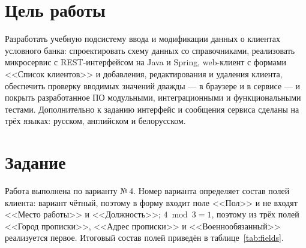 \documentclass[14pt,a4paper]{extarticle}
\begin{document}

\tableofcontents

\section{Цель работы}

Разработать учебную подсистему ввода и модификации данных о клиентах условного банка:
спроектировать схему данных со справочниками, реализовать микросервис с REST-интерфейсом
на Java и Spring, web-клиент с формами <<Список клиентов>> и добавления, редактирования и
удаления клиента, обеспечить проверку вводимых значений дважды --- в браузере и в сервисе ---
и покрыть разработанное ПО модульными, интеграционными и функциональными тестами.
Дополнительно к заданию интерфейс и сообщения сервиса сделаны на трёх языках: русском,
английском и белорусском.

\section{Задание}

Работа выполнена по варианту №\,4. Номер варианта определяет состав полей клиента: вариант
чётный, поэтому в форму
входит поле <<Пол>> и не входят <<Место работы>> и <<Должность>>; $4 \bmod 3 = 1$, поэтому
из трёх полей <<Город прописки>>, <<Адрес прописки>> и <<Военнообязанный>> реализуется первое.
Итоговый состав полей приведён в таблице~\ref{tab:fields}.
\end{document}
